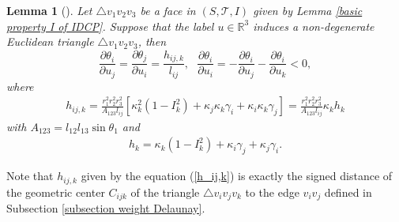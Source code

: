 \documentclass[12pt]{amsart}
\newtheorem{lemma}[theorem]{Lemma}
\begin{document}
\begin{lemma}[\cite{Guo, Xu AIM}]
\label{derivative angles}
Let $\triangle v_1v_2v_3$ be a face in $(S, \mathcal{T}, I)$ given by Lemma \ref{basic property I of IDCP}.
Suppose that the label $u\in \mathbb{R}^3$ induces a non-degenerate Euclidean triangle $\triangle v_1v_2v_3$, then
\begin{equation}
\label{angle deform}
	    \frac{\partial \theta_i}{\partial u_j}=\frac{\partial \theta_j}{\partial u_i}=\frac{h_{ij,k}}{l_{ij}}, \ \ \
\frac{\partial \theta_i}{\partial u_i}=-\frac{\partial \theta_i}{\partial u_j}-\frac{\partial \theta_i}{\partial u_k}<0,
\end{equation}
		where
		\begin{equation}\label{h_ij,k}
			\begin{aligned}
				h_{ij,k}
			=\frac{r_1^2r_2^2r_3^2}{A_{123}l_{ij}}[\kappa_k^2(1-I_k^2)+\kappa_j\kappa_k\gamma_{i}+\kappa_i\kappa_k\gamma_{j}]
				=\frac{r_1^2r_2^2r_3^2}{A_{123}l_{ij}}\kappa_kh_k
			\end{aligned}
		\end{equation}
		with
$A_{123}=l_{12}l_{13}\sin\theta_1$ and
		\begin{equation}
		\label{h_i}
			\begin{aligned}
h_k=\kappa_k(1-I_k^2)+\kappa_i\gamma_{j}+\kappa_j\gamma_{i}.
			\end{aligned}
		\end{equation}
\end{lemma}


Note that $h_{ij,k}$ given by the equation (\ref{h_ij,k}) is exactly the signed distance of the geometric center $C_{ijk}$ of the triangle $\triangle v_iv_jv_k$ to the edge $v_iv_j$ defined in Subsection \ref{subsection weight Delaunay}.
\end{document}
